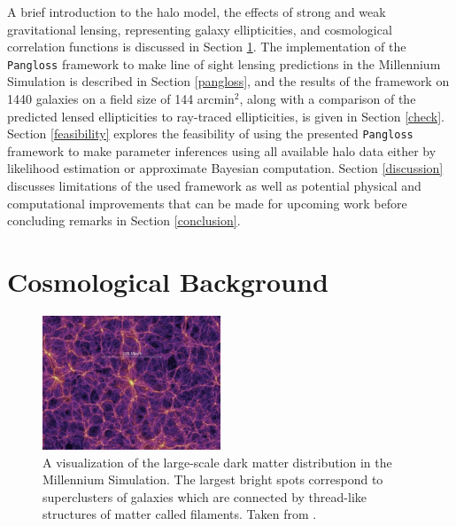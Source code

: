 \documentclass[%
 reprint,
 amsmath,amssymb,
 aps,nofootinbib
]{revtex4-1}
\begin{document}
A brief introduction to the halo model, the effects of strong and weak gravitational lensing, representing galaxy ellipticities, and cosmological correlation functions is discussed in Section \ref{background}. The implementation of the \texttt{Pangloss} framework to make line of sight lensing predictions in the Millennium Simulation is described in Section \ref{pangloss}, and the results of the framework on 1440 galaxies on a field size of 144 arcmin$^2$, along with a comparison of the predicted lensed ellipticities to ray-traced ellipticities, is given in Section \ref{check}. Section \ref{feasibility} explores the feasibility of using the presented \texttt{Pangloss} framework to make parameter inferences using all available halo data either by likelihood estimation or approximate Bayesian computation. Section \ref{discussion} discusses limitations of the used framework as well as potential physical and computational improvements that can be made for upcoming work before concluding remarks in Section \ref{conclusion}.

\section{Cosmological Background} \label{background}

\begin{figure}
    \centering
    \includegraphics[width=0.475\textwidth]{figs-swe/thesis/ms_structure.jpg}
    \captionsetup{justification=raggedright,singlelinecheck=false}
    \caption{A visualization of the large-scale dark matter distribution in the Millennium Simulation. The largest bright spots correspond to superclusters of galaxies which are connected by thread-like structures of matter called filaments. Taken from \cite{ms_figures}.}
    \label{fig:ms_structure}
\end{figure}
\end{document}
